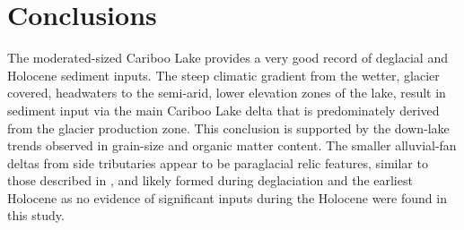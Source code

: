 \documentclass[Royal,times,doublespace,sageh]{sagej}
\begin{document}
\hypertarget{conclusions}{%
\section{Conclusions}\label{conclusions}}

The moderated-sized Cariboo Lake provides a very good record of
deglacial and Holocene sediment inputs. The steep climatic gradient from
the wetter, glacier covered, headwaters to the semi-arid, lower
elevation zones of the lake, result in sediment input via the main
Cariboo Lake delta that is predominately derived from the glacier
production zone. This conclusion is supported by the down-lake trends
observed in grain-size and organic matter content. The smaller
alluvial-fan deltas from side tributaries appear to be paraglacial relic
features, similar to those described in \citet{Church1972}, and likely
formed during deglaciation and the earliest Holocene as no evidence of
significant inputs during the Holocene were found in this study.
\end{document}
